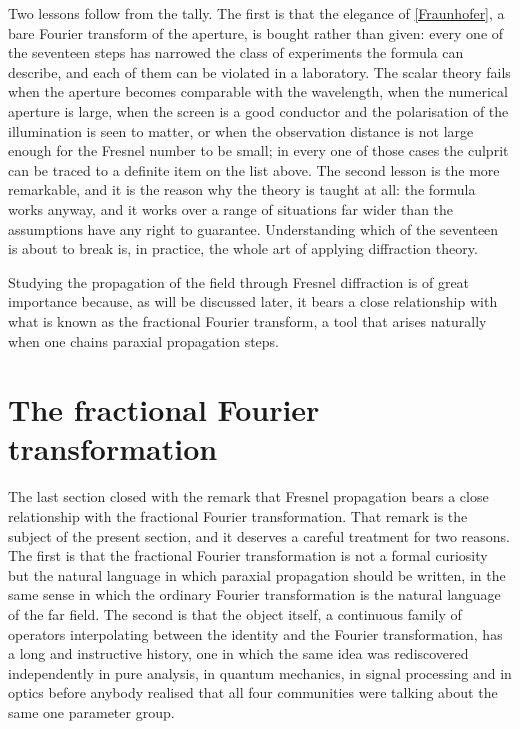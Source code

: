 Two lessons follow from the tally. The first is that the elegance of \eqref{Fraunhofer}, a bare Fourier transform of the aperture, is bought rather than given: every one of the seventeen steps has narrowed the class of experiments the formula can describe, and each of them can be violated in a laboratory. The scalar theory fails when the aperture becomes comparable with the wavelength, when the numerical aperture is large, when the screen is a good conductor and the polarisation of the illumination is seen to matter, or when the observation distance is not large enough for the Fresnel number to be small; in every one of those cases the culprit can be traced to a definite item on the list above. The second lesson is the more remarkable, and it is the reason why the theory is taught at all: the formula works anyway, and it works over a range of situations far wider than the assumptions have any right to guarantee. Understanding which of the seventeen is about to break is, in practice, the whole art of applying diffraction theory.


Studying the propagation of the field through Fresnel diffraction is of great importance because, as will be discussed later, it bears a close relationship with what is known as the fractional Fourier transform, a tool that arises naturally when one chains paraxial propagation steps.

\section{The fractional Fourier transformation}\label{sec:FrFT}

	The last section closed with the remark that Fresnel propagation bears a close relationship with the fractional Fourier transformation. That remark is the subject of the present section, and it deserves a careful treatment for two reasons. The first is that the fractional Fourier transformation is not a formal curiosity but the natural language in which paraxial propagation should be written, in the same sense in which the ordinary Fourier transformation is the natural language of the far field. The second is that the object itself, a continuous family of operators interpolating between the identity and the Fourier transformation, has a long and instructive history, one in which the same idea was rediscovered independently in pure analysis, in quantum mechanics, in signal processing and in optics before anybody realised that all four communities were talking about the same one parameter group.

